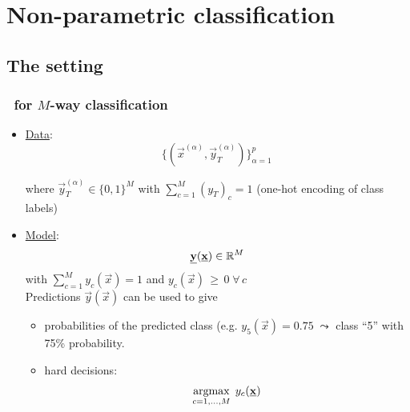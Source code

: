 \section{Non-parametric classification}


\subsection{The setting}


\begin{frame}\frametitle{\subsecname~for $M$-way classification}


\begin{itemize}
	\item[]\underline{Data}:
	\begin{equation*}
	\Big\{ \left(\vec x^{(\alpha)}, \vec y^{(\alpha)}_{T} \right) \Big\}_{\alpha=1}^{p}\,
	\end{equation*}

	where $\vec y_T^{(\alpha)} \in \{0, 1\}^M$ with $\sum_{c=1}^{M} (y_{T})_c = 1$ (one-hot encoding of class labels)\\

	\pause

	\item[]\underline{Model}:
	\begin{equation*}
	\underline{\mathbf{y}}(\underline{\mathbf{x}}) \in \mathbb{R}^M 
	\end{equation*}
	with $\sum_{c=1}^{M} y_c(\vec x) = 1$ and $y_c(\vec x)\,\ge\,0\; \forall\,c$\\[2mm]
	
	Predictions $\vec y(\vec x)$ can be used to give
	\begin{itemize}
	\item probabilities of the predicted class (e.g. $y_5(\vec x) = 0.75\; \leadsto$ class ``5'' with 75\% probability.
	\item hard decisions:
    \begin{equation}
    \argmax_{c=1,\ldots,M}\;y_c(\vec x)
    \end{equation}
	\end{itemize}

\end{itemize}

\end{frame}

